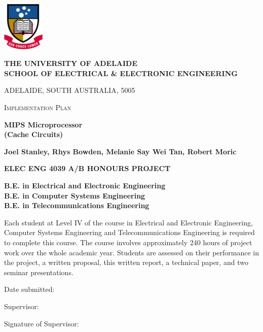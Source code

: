 \documentclass[a4paper,12pt]{article}
\begin{document}
\begin{titlepage}
\vspace{-1.5cm}
\begin{center}
\includegraphics[width=2cm]{ualogo_colour.jpg}
\vspace{1cm}

\textbf{\large THE UNIVERSITY OF ADELAIDE}\\

\textbf{SCHOOL OF ELECTRICAL \& ELECTRONIC ENGINEERING}

{\small ADELAIDE, SOUTH AUSTRALIA, 5005}

\vspace{1.5cm}
\textsc{Implementation Plan}
\vspace{1cm}

\textbf{\LARGE MIPS Microprocessor\\(Cache Circuits)}

\vspace{1cm}
\textbf{Joel Stanley, Rhys Bowden, Melanie Say Wei Tan, Robert Moric}

\vspace{3.5cm}
\textbf{\large ELEC ENG 4039 A/B HONOURS PROJECT}

\vspace{1ex}
\setlength{\linespread}{1}
\textbf{B.E. in Electrical and Electronic Engineering\\
B.E. in Computer Systems Engineering\\
B.E. in Telecommunications Engineering\\}
\end{center}

\vfill
Each student at Level IV of the course in Electrical and
Electronic Engineering, Computer Systems Engineering and
Telecommunications Engineering is required to complete this course.
The course involves approximately 240 hours of project work over the
whole academic year.  Students are assessed on their performance in
the project, a written proposal, this written report, a technical
paper, and two seminar presentations.

\vspace{1cm}
Date submitted:

\vspace{1ex}
Supervisor:

\vspace{1ex}
Signature of Supervisor:
\end{titlepage}
\end{document}
